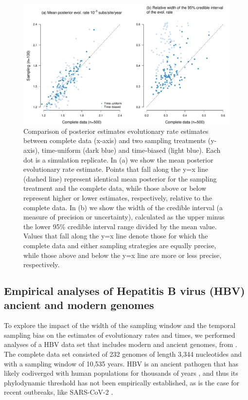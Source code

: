 \documentclass[11pt]{article}
\begin{document}
\begin{figure}[H]
	\begin{center}
		\includegraphics[scale=0.5, angle=0]{sampling_bias_summary_rates.pdf}
		\caption{Comparison of posterior estimates evolutionary rate estimates between complete data (x-axis) and two sampling treatments (y-axis), time-uniform (dark blue) and time-biased (light blue). Each dot is a simulation replicate. In (a) we show the mean posterior evolutionary rate estimate. Points that fall along the y=x line (dashed line) represent identical mean posterior for the sampling treatment and the complete data, while those above or below represent higher or lower estimates, respectively, relative to the complete data. In (b) we show the width of the credible interval (a measure of precision or uncertainty), calculated as the upper minus the lower 95\% credible interval range divided by the mean value. Values that fall along the y=x line denote those for which the complete data and either sampling strategies are equally precise, while those above and below the y=x line are more or less precise, respectively.}
		\label{figure:Fig5}
	\end{center}
\end{figure}

\subsection{Empirical analyses of Hepatitis B virus (HBV) ancient and modern genomes}
To explore the impact of the width of the sampling window and the temporal sampling bias on the estimates of evolutionary rates and times, we performed analyses of a HBV data set that includes modern and ancient genomes, from \cite{kocher2021ten}. The complete data set consisted of 232 genomes of length 3,344 nucleotides and with a sampling window of 10,535 years. HBV is an ancient pathogen that has likely codiverged with human populations for thousands of years \citep{locarnini2021origins, zehender2014enigmatic, paraskevis2013dating}, and thus its phylodynamic threshold has not been empirically established, as is the case for recent outbreaks, like SARS-CoV-2 \citep{duchene2020temporal}. 
\end{document}
